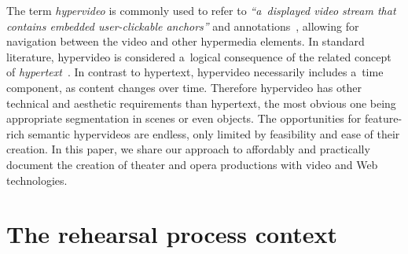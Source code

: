 \documentclass[conference]{IEEEtran}
\newcommand{\todo}[1]{\noindent\textcolor{red}{{\bf \{ToDo} #1{\bf \}}}}
\begin{document}
The term \emph{hypervideo} is commonly used to refer to
\textit{``a~displayed video stream that contains embedded user-clickable anchors''}%
and annotations~\cite{sawhney1996hypercafe}, %
allowing for navigation between the video and other hypermedia elements.
In standard literature, hypervideo is considered a~logical consequence
of the related concept of \emph{hypertext}~\cite{economist2006hypervideo}. %
In contrast to hypertext, hypervideo necessarily includes a~time component,
as content changes over time.
Therefore hypervideo has other technical and aesthetic requirements
than hypertext, the most obvious one being appropriate segmentation in scenes
or even objects.
The opportunities for feature-rich semantic hypervideos are endless,
only limited by feasibility and ease of their creation.
In this paper, we share our approach to affordably and practically document
the creation of theater and opera productions with video and Web technologies.


\section{The rehearsal process context}
\label{sec:context}
%
\end{document}
